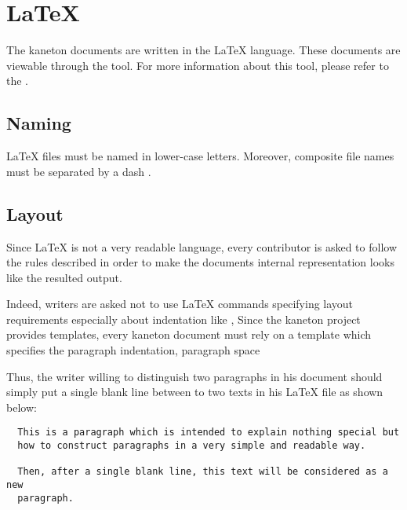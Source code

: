 %
%
%
%
%
%

%
%

\section{\LaTeX}
\label{section:latex}

The kaneton documents are written in the {\LaTeX} language. These documents
are viewable through the  tool. For more information about
this tool, please refer to the .

%
%

\subsection{Naming}

{\LaTeX} files must be named in lower-case letters. Moreover,
composite file names must be separated by a dash \code{-}.

%
%

\subsection{Layout}

Since {\LaTeX} is not a very readable language, every contributor
is asked to follow the rules described in order to make the documents
internal representation looks like the resulted output.

Indeed, writers are asked not to use {\LaTeX} commands specifying
layout requirements especially about indentation like ,
 \etc{} Since the kaneton project provides templates,
every kaneton document must rely on a template which specifies the paragraph
indentation, paragraph space \etc{}

Thus, the writer willing to distinguish two paragraphs in his
document should simply put a single blank line between to two texts
in his {\LaTeX} file as shown below:

\begin{verbatim}
  This is a paragraph which is intended to explain nothing special but
  how to construct paragraphs in a very simple and readable way.

  Then, after a single blank line, this text will be considered as a new
  paragraph.
\end{verbatim}


